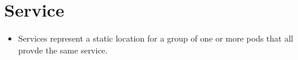 \chapter{Service}


\begin{itemize}
	\item Services represent a static location for a group of one or more pods that all provde the same service.
\end{itemize}